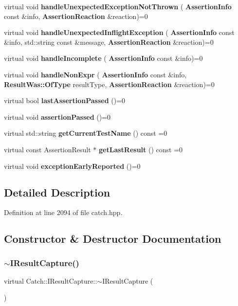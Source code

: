 \begin{DoxyCompactItemize}
\item 
virtual void \textbf{ handle\+Unexpected\+Exception\+Not\+Thrown} (\textbf{ Assertion\+Info} const \&info, \textbf{ Assertion\+Reaction} \&reaction)=0
\item 
virtual void \textbf{ handle\+Unexpected\+Inflight\+Exception} (\textbf{ Assertion\+Info} const \&info, std\+::string const \&message, \textbf{ Assertion\+Reaction} \&reaction)=0
\item 
virtual void \textbf{ handle\+Incomplete} (\textbf{ Assertion\+Info} const \&info)=0
\item 
virtual void \textbf{ handle\+Non\+Expr} (\textbf{ Assertion\+Info} const \&info, \textbf{ Result\+Was\+::\+Of\+Type} result\+Type, \textbf{ Assertion\+Reaction} \&reaction)=0
\item 
virtual bool \textbf{ last\+Assertion\+Passed} ()=0
\item 
virtual void \textbf{ assertion\+Passed} ()=0
\item 
virtual std\+::string \textbf{ get\+Current\+Test\+Name} () const =0
\item 
virtual const Assertion\+Result $\ast$ \textbf{ get\+Last\+Result} () const =0
\item 
virtual void \textbf{ exception\+Early\+Reported} ()=0
\end{DoxyCompactItemize}


\subsection{Detailed Description}


Definition at line 2094 of file catch.\+hpp.



\subsection{Constructor \& Destructor Documentation}
\mbox{\label{struct_catch_1_1_i_result_capture_a3bd16719d6772b7470887fc36c6d0808}} 
\subsubsection{$\sim$IResultCapture()}
{\footnotesize\ttfamily virtual Catch\+::\+I\+Result\+Capture\+::$\sim$\+I\+Result\+Capture (\begin{DoxyParamCaption}{ }\end{DoxyParamCaption})\hspace{0.3cm}{\ttfamily [virtual]}}



